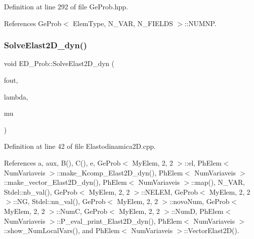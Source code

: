 Definition at line 292 of file Ge\+Prob.\+hpp.



References Ge\+Prob$<$ Elem\+Type, N\+\_\+\+V\+A\+R, N\+\_\+\+F\+I\+E\+L\+D\+S $>$\+::\+N\+U\+M\+NP.

\mbox{\label{classED__Prob_a587cd05e1422af94fadd3eb73a8974b0}} 
\subsubsection{\texorpdfstring{Solve\+Elast2\+D\+\_\+dyn()}{SolveElast2D\_dyn()}}
{\footnotesize\ttfamily void E\+D\+\_\+\+Prob\+::\+Solve\+Elast2\+D\+\_\+dyn (\begin{DoxyParamCaption}\item[{F\+I\+LE $\ast$}]{fout,  }\item[{double}]{lambda,  }\item[{double}]{mu }\end{DoxyParamCaption})}



Definition at line 42 of file Elastodinamica2\+D.\+cpp.



References a, aux, B(), C(), e, Ge\+Prob$<$ My\+Elem, 2, 2 $>$\+::el, Ph\+Elem$<$ Num\+Variaveis $>$\+::make\+\_\+\+Kcomp\+\_\+\+Elast2\+D\+\_\+dyn(), Ph\+Elem$<$ Num\+Variaveis $>$\+::make\+\_\+vector\+\_\+\+Elast2\+D\+\_\+dyn(), Ph\+Elem$<$ Num\+Variaveis $>$\+::map(), N\+\_\+\+V\+AR, Stdel\+::nb\+\_\+val(), Ge\+Prob$<$ My\+Elem, 2, 2 $>$\+::\+N\+E\+L\+EM, Ge\+Prob$<$ My\+Elem, 2, 2 $>$\+::\+NG, Stdel\+::nn\+\_\+val(), Ge\+Prob$<$ My\+Elem, 2, 2 $>$\+::novo\+Num, Ge\+Prob$<$ My\+Elem, 2, 2 $>$\+::\+NumC, Ge\+Prob$<$ My\+Elem, 2, 2 $>$\+::\+NumD, Ph\+Elem$<$ Num\+Variaveis $>$\+::\+P\+\_\+eval\+\_\+print\+\_\+\+Elast2\+D\+\_\+dyn(), Ph\+Elem$<$ Num\+Variaveis $>$\+::show\+\_\+\+Num\+Local\+Vars(), and Ph\+Elem$<$ Num\+Variaveis $>$\+::\+Vector\+Elast2\+D().

